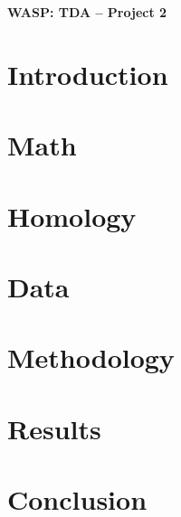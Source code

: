 \documentclass[11pt,compsoc,a4paper]{IEEEtran}
\begin{document}
\onecolumn




\newcommand{\proname}{TEBA}
\begin{center}
    \Large{\textbf{WASP: TDA -- Project 2}}\\ \vspace{0.25cm} 
\end{center}

\setcounter{section}{2}
\section*{\Large{Introduction}}



\section*{\Large{Math}}



\section*{\Large{Homology}}



\section*{\Large{Data}}



\section*{\Large{Methodology}}



\section*{\Large{Results}}



\section*{\Large{Conclusion}}


\subsection{}
{

}


%
\printbibliography
\end{document}
